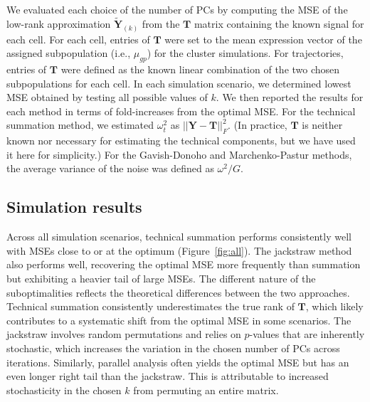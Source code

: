 \documentclass[10pt,letterpaper]{article}
\begin{document}
We evaluated each choice of the number of PCs by computing the MSE of the low-rank approximation $\mathbf{\tilde Y}_{(k)}$ from the $\mathbf{T}$ matrix containing the known signal for each cell.
For each cell, entries of $\mathbf{T}$ were set to the mean expression vector of the assigned subpopulation (i.e., $\mu_{gp}$) for the cluster simulations.
For trajectories, entries of $\mathbf{T}$ were defined as the known linear combination of the two chosen subpopulations for each cell.
In each simulation scenario, we determined lowest MSE obtained by testing all possible values of $k$.
We then reported the results for each method in terms of fold-increases from the optimal MSE.
For the technical summation method, we estimated $\omega^2_t$ as $||\mathbf{Y} - \mathbf{T}||^2_F$.
(In practice, $\mathbf{T}$ is neither known nor necessary for estimating the technical components, but we have used it here for simplicity.)
For the Gavish-Donoho and Marchenko-Pastur methods, the average variance of the noise was defined as $\omega^2/G$.

\subsection{Simulation results}
Across all simulation scenarios, technical summation performs consistently well with MSEs close to or at the optimum (Figure~\ref{fig:all}). 
The jackstraw method also performs well, recovering the optimal MSE more frequently than summation but exhibiting a heavier tail of large MSEs.
The different nature of the suboptimalities reflects the theoretical differences between the two approaches.
Technical summation consistently underestimates the true rank of $\mathbf{T}$, which likely contributes to a systematic shift from the optimal MSE in some scenarios.
The jackstraw involves random permutations and relies on $p$-values that are inherently stochastic, which increases the variation in the chosen number of PCs across iterations.
Similarly, parallel analysis often yields the optimal MSE but has an even longer right tail than the jackstraw.
This is attributable to increased stochasticity in the chosen $k$ from permuting an entire matrix.
\end{document}
